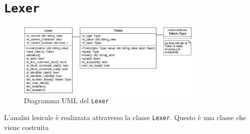 \section{\texttt{Lexer}}
\label{sec:lexer}

\begin{figure}[H]
	\centering
	\includegraphics[width=0.8\textwidth]{figures/lexer.png}
	\caption{Diagramma UML del \texttt{Lexer}}
	\label{fig:lexer-uml}
\end{figure}

L'analisi lesicale \`e realizzata attraverso la classe \texttt{Lexer}. Questo \`e una classe che viene costruita
